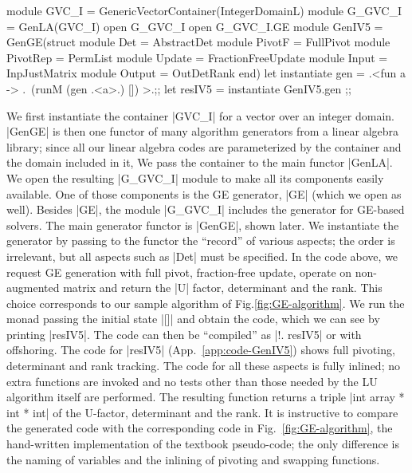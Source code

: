 \documentclass{elsart}
\begin{document}
\begin{code}
module GVC_I = GenericVectorContainer(IntegerDomainL)
module G_GVC_I = GenLA(GVC_I)
open G_GVC_I
open G_GVC_I.GE
module GenIV5 = GenGE(struct 
    module Det = AbstractDet
    module PivotF = FullPivot
    module PivotRep = PermList
    module Update = FractionFreeUpdate
    module Input = InpJustMatrix
    module Output = OutDetRank end)
let instantiate gen =
    .<fun a -> .~(runM (gen .<a>.) []) >.;;
let resIV5 = instantiate GenIV5.gen ;;
\end{code}
%
We first instantiate the container |GVC_I| for a vector over an
integer domain.  |GenGE| is then one functor of many algorithm
generators from a linear algebra library; since all our linear algebra codes
are parameterized by the container and the domain included in it,
We pass the container to the main functor |GenLA|.
We open the resulting |G_GVC_I| module
to make all its components easily available. One of those components
is the GE generator, |GE| (which we open as well). Besides |GE|, the
module |G_GVC_I| includes the generator for GE-based solvers.  The main
generator functor is |GenGE|, shown later.  We instantiate the
generator by passing to the functor the ``record'' of various aspects; the
order is irrelevant, but all aspects such as |Det| must be
specified. In the code above, we request GE generation with full
pivot, fraction-free update, operate on non-augmented matrix and
return the |U| factor, determinant and the rank. This choice
corresponds to our sample algorithm of Fig.\ref{fig:GE-algorithm}.
We run the monad
passing the initial state |[]| and obtain the code, which we can see
by printing |resIV5|. The code can then be ``compiled'' as |!. resIV5|
or with offshoring\cite{offshoring}. The code for |resIV5|
(App.~\ref{app:code-GenIV5}) shows full
pivoting, determinant and rank tracking. The code for all these
aspects is fully inlined; no extra functions are invoked and no tests
other than those needed by the LU algorithm itself are performed. The
resulting function returns a triple |int array * int * int| of the
U-factor, determinant and the rank. It is instructive to compare the
generated code with the corresponding code in
Fig.~\ref{fig:GE-algorithm}, the hand-written implementation of the
textbook pseudo-code; the only difference is the naming of
variables and the inlining of pivoting and swapping functions.
\end{document}
